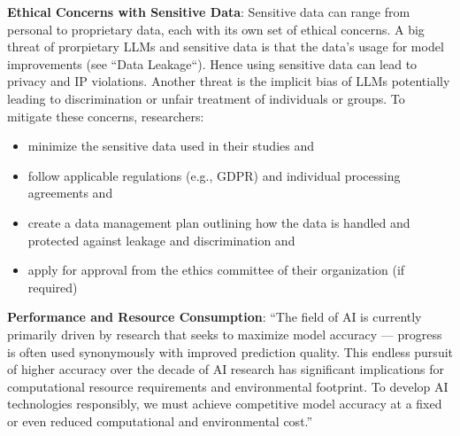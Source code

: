 \textbf{Ethical Concerns with Sensitive Data}:
Sensitive data can range from personal to proprietary data, each with its own set of ethical concerns. A big threat of prorpietary LLMs and sensitive data is that the data's usage for model improvements (see ``Data Leakage``). Hence using sensitive data can lead to privacy and IP violations.
Another threat is the implicit bias of LLMs potentially leading to discrimination or unfair treatment of individuals or groups.
To mitigate these concerns, researchers:
\begin{itemize}
  \item \should minimize the sensitive data used in their studies and
  \item \must follow applicable regulations (e.g., GDPR) and individual processing agreements and
  \item \should create a data management plan outlining how the data is handled and protected against leakage and discrimination and
  \item \should apply for approval from the ethics committee of their organization (if required)
\end{itemize}

\textbf{Performance and Resource Consumption}:
\enquote{The field of AI is currently primarily driven by research that seeks to maximize model accuracy — progress is often used synonymously with improved prediction quality. This endless pursuit of higher accuracy over the decade of AI research has significant implications for computational resource requirements and environmental footprint. To develop AI technologies responsibly, we must achieve competitive model accuracy at a fixed or even reduced computational and environmental cost.} ~\cite{DBLP:conf/mlsys/WuRGAAMCBHBGGOM22}

